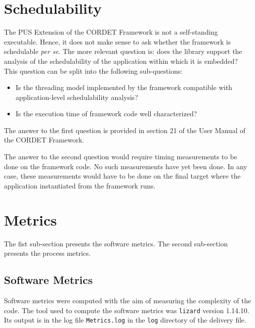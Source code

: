 \documentclass{pnp_article}
\begin{document}
\section{Schedulability}\label{sec:svrSched}
The PUS Extension of the CORDET Framework is not a self-standing executable. Hence, it does not make sense to ask whether the framework is schedulable \textit{per se}. The more relevant question is: does the library support the analysis of the schedulability of the application within which it is embedded? This question can be split into the following sub-questions:

\begin{itemize}
\item Is the threading model implemented by the framework compatible with application-level schedulability analysis?
\item Is the execution time of framework code well characterized?
\end{itemize}

The answer to the first question is provided in section 21 of the User Manual of the CORDET Framework.

The answer to the second question would require timing measurements to be done on the framework code. No such measurements have yet been done. In any case, these measurements would have to be done on the final target where the application instantiated from the framework runs. 



\section{Metrics}\label{sec:svrMetrics}
The fist sub-section presents the software metrics. The second sub-section presents the process metrics.

\subsection{Software Metrics}\label{sec:svrSwMetrics}
Software metrics were computed with the aim of measuring the complexity of the code. The tool used to compute the software metrics was \texttt{lizard} version 1.14.10. Its output is in the log file \texttt{Metrics.log} in the \texttt{log} directory of the delivery file.
\end{document}
